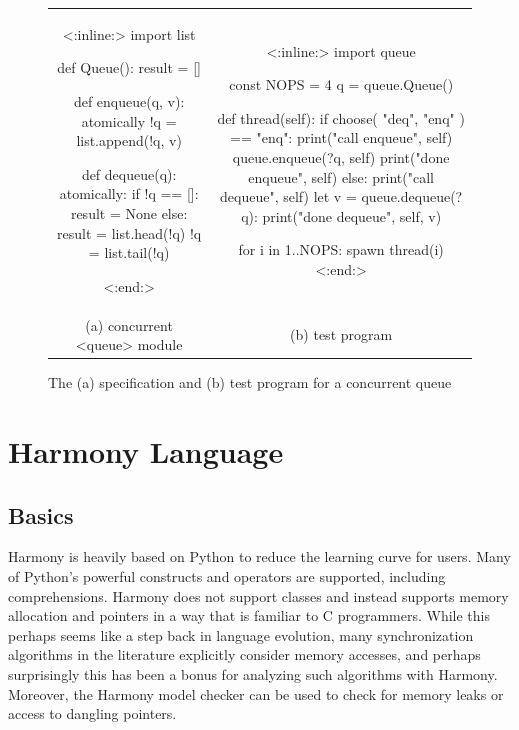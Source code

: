 \documentclass[twocolumn]{article}
\begin{document}
\begin{figure}[h]
\begin{center}
\begin{tabular}{cc}
{\footnotesize
\begin{tcolorbox}[width=0.45\linewidth]
<{:inline:}>
import list

def Queue():
    result = []

def enqueue(q, v):
    atomically !q = list.append(!q, v)

def dequeue(q):
    atomically:
        if !q == []:
            result = None
        else:
            result = list.head(!q)
            !q = list.tail(!q)

<{:end:}>
\end{tcolorbox}
}
&
{\footnotesize
\begin{tcolorbox}[width=0.48\linewidth]
<{:inline:}>
import queue

const NOPS = 4
q = queue.Queue()

def thread(self):
    if choose({ "deq", "enq" }) == "enq":
        print("call enqueue", self)
        queue.enqueue(?q, self)
        print("done enqueue", self)
    else:
        print("call dequeue", self)
        let v = queue.dequeue(?q):
            print("done dequeue", self, v)

for i in {1..NOPS}: spawn thread(i)
<{:end:}>
\end{tcolorbox}
}
\\
(a) concurrent <{queue}> module & (b) test program
\end{tabular}
\end{center}
\caption{The (a) specification and (b) test program for a concurrent queue}
\label{fig:queue}
\end{figure}

\section{Harmony Language}

\subsection{Basics}

Harmony is heavily based on Python to reduce the learning curve for
users.  Many of Python's powerful constructs and operators are
supported, including comprehensions.  Harmony does
not support classes and instead supports memory allocation and
pointers in a way that is familiar to C programmers.  While this
perhaps seems like a step back in language evolution, many
synchronization algorithms in the literature explicitly consider
memory accesses, and perhaps surprisingly this has been a bonus for
analyzing such algorithms with Harmony.  Moreover, the Harmony model
checker can be used to check for memory leaks or access to dangling
pointers.
\end{document}
